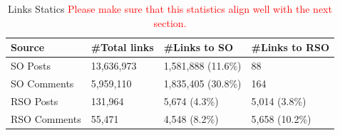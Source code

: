 \begin{table}
	\caption{Links Statics \textcolor{red}{Please make sure that this statistics align well with the next section.}}
	\centering
	\small
	\label{tab:links}
	\begin{tabular}{llll}
       \hline
		Source       &\#Total links & \#Links to SO   & \#Links to RSO\\ \hline
		SO Posts     & 13,636,973    & 1,581,888 (11.6\%)      & 88 \\
		SO Comments  & 5,959,110     & 1,835,405 (30.8\%)    & 164\\
		RSO Posts    & 131,964       & 5,674  (4.3\%)        & 5,014 (3.8\%) \\
		RSO Comments & 55,471        & 4,548  (8.2\%)        & 5,658 (10.2\%) \\
       \hline
	\end{tabular}

\end{table}	
\par

